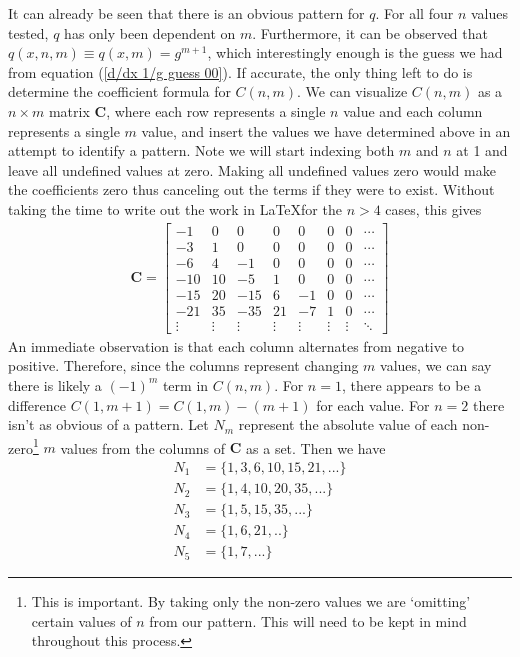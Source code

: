 It can already be seen that there is an obvious pattern for $q$. For all four $n$ values tested, $q$ has only been dependent on $m$. Furthermore, it can be observed that $q(x,n,m) \equiv q(x,m) = g^{m+1}$, which interestingly enough is the guess we had from equation (\ref{d/dx 1/g guess 00}). If accurate, the only thing left to do is determine the coefficient formula for $C(n,m)$. We can visualize $C(n,m)$ as a $n\times m$ matrix $\mathbf{C}$, where each row represents a single $n$ value and each column represents a single $m$ value, and insert the values we have determined above in an attempt to identify a pattern. Note we will start indexing both $m$ and $n$ at 1 and leave all undefined values at zero. Making all undefined values zero would make the coefficients zero thus canceling out the terms if they were to exist. Without taking the time to write out the work in \LaTeX for the $n>4$ cases, this gives
\begin{align}
\mathbf{C} = 	\begin{bmatrix}
-1 & 0 & 0 & 0 & 0 & 0 & 0 & \cdots \\
-3 & 1 & 0 & 0 & 0 & 0 & 0 & \cdots \\
-6 & 4 & -1 & 0 & 0 & 0 & 0 & \cdots \\
-10 & 10 & -5 & 1 & 0 & 0 & 0 & \cdots \\
-15 & 20 & -15 & 6 & -1 & 0 & 0 & \cdots \\
-21 & 35 & -35 & 21 & -7 & 1 & 0 & \cdots \\
\vdots & \vdots & \vdots & \vdots & \vdots& \vdots& \vdots & \ddots
\end{bmatrix} \label{quotient_derivation_C_matrix}
\end{align}
An immediate observation is that each column alternates from negative to positive. Therefore, since the columns represent changing $m$ values, we can say there is likely a $(-1)^m$ term in $C(n,m)$. For $n=1$, there appears to be a difference $C(1,m+1) = C(1,m)-(m+1)$ for each value. For $n=2$ there isn't as obvious of a pattern. Let $N_m$ represent the absolute value of each non-zero\footnote{This is important. By taking only the non-zero values we are `omitting' certain values of $n$ from our pattern. This will need to be kept in mind throughout this process.} $m$ values from the columns of $\mathbf{C}$ as a set. Then we have
\begin{align}
N_1 &= \{1,3,6,10,15,21,...\} \\
N_2 &= \{1,4,10,20,35,...\} \\
N_3 &= \{1,5,15,35,...\} \\
N_4 &= \{1,6,21,..\} \\
N_5 &= \{1,7,...\}
\end{align}
